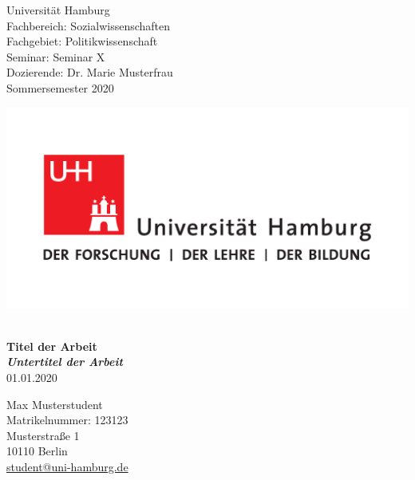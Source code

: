 \begin{titlepage}
\begin{minipage}[t]{0.6\textwidth}
\flushleft 
Universität Hamburg \\
Fachbereich: Sozialwissenschaften \\
Fachgebiet: Politikwissenschaft \\
Seminar: Seminar X \\ 
Dozierende: Dr. Marie Musterfrau\\
Sommersemester 2020 \\
\end{minipage}
\hfill
\begin{minipage}[t][1.7cm][b]{0.35\textwidth}
\includegraphics[width=\textwidth]{style/UHH-Logo_2010_Farbe_CMYK.pdf}
\end{minipage}

\vspace*{\fill}
\begin{center}
\vspace{1cm} \vspace{0.2cm} \\
\textbf{\Large Titel der Arbeit \\
  \vspace {0,5cm} \small\emph{Untertitel der Arbeit}} \\
\vspace{0.5cm}
01.01.2020
\end{center}
\vspace*{\fill}

\begin{minipage}[t]{0.48\textwidth}
\flushleft
Max Musterstudent \\
Matrikelnummer: 123123 \\
Musterstraße 1 \vspace{0.1cm} \\
10110 Berlin \vspace{0.1cm} \\
\href{mailto:student@uni-hamburg.de}{student@uni-hamburg.de} \\
\end{minipage}

\end{titlepage}